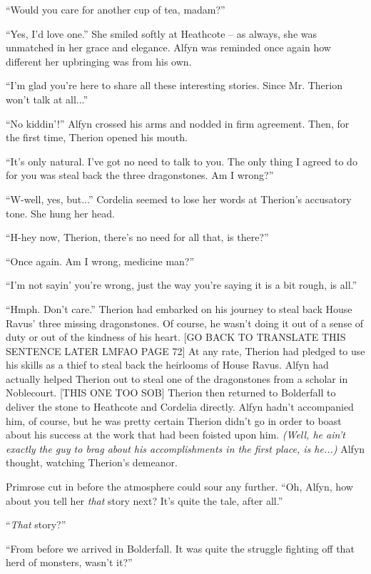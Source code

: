 ``Would you care for another cup of tea, madam?''

``Yes, I'd love one.'' She smiled softly at Heathcote -- as always, she was unmatched in her grace and elegance. Alfyn was reminded once again how different her upbringing was from his own.

``I'm glad you're here to share all these interesting stories. Since Mr. Therion won't talk at all...''

``No kiddin'!'' Alfyn crossed his arms and nodded in firm agreement. Then, for the first time, Therion opened his mouth.

``It's only natural. I've got no need to talk to you. The only thing I agreed to do for you was steal back the three dragonstones. Am I wrong?''

``W-well, yes, but...'' Cordelia seemed to lose her words at Therion's accusatory tone. She hung her head.

``H-hey now, Therion, there's no need for all that, is there?''

``Once again. Am I wrong, medicine man?''

``I'm not sayin' you're wrong, just the way you're saying it is a bit rough, is all.''

``Hmph. Don't care.'' Therion had embarked on his journey to steal back House Ravus' three missing dragonstones. Of course, he wasn't doing it out of a sense of duty or out of the kindness of his heart. [GO BACK TO TRANSLATE THIS SENTENCE LATER LMFAO PAGE 72] At any rate, Therion had pledged to use his skills as a thief to steal back the heirlooms of House Ravus. Alfyn had actually helped Therion out to steal one of the dragonstones from a scholar in Noblecourt. [THIS ONE TOO SOB] Therion then returned to Bolderfall to deliver the stone to Heathcote and Cordelia directly. Alfyn hadn't accompanied him, of course, but he was pretty certain Therion didn't go in order to boast about his success at the work that had been foisted upon him. \emph{(Well, he ain't exactly the guy to brag about his accomplishments in the first place, is he...)} Alfyn thought, watching Therion's demeanor.

Primrose cut in before the atmosphere could sour any further. ``Oh, Alfyn, how about you tell her \emph{that} story next? It's quite the tale, after all.''

``\emph{That} story?''

``From before we arrived in Bolderfall. It was quite the struggle fighting off that herd of monsters, wasn't it?''

